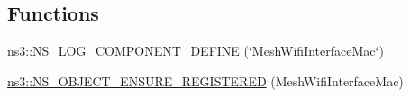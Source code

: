 \subsection*{Functions}
\begin{DoxyCompactItemize}
\item 
\hyperlink{namespacens3_acbbc99dfeced387f3dec0c870b2a561c}{ns3\+::\+N\+S\+\_\+\+L\+O\+G\+\_\+\+C\+O\+M\+P\+O\+N\+E\+N\+T\+\_\+\+D\+E\+F\+I\+NE} (\char`\"{}Mesh\+Wifi\+Interface\+Mac\char`\"{})
\item 
\hyperlink{namespacens3_ab9c43a701cc221e795bcec29f8c87504}{ns3\+::\+N\+S\+\_\+\+O\+B\+J\+E\+C\+T\+\_\+\+E\+N\+S\+U\+R\+E\+\_\+\+R\+E\+G\+I\+S\+T\+E\+R\+ED} (Mesh\+Wifi\+Interface\+Mac)
\end{DoxyCompactItemize}

